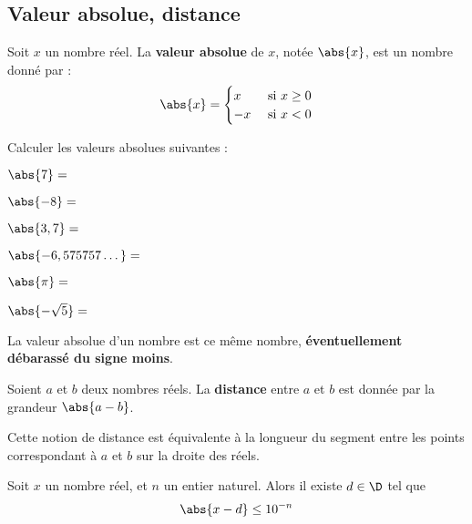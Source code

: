 \documentclass{article}
\begin{document}
\subsection{Valeur absolue, distance}
\begin{tcolorbox}
\begin{definition}
Soit $x$ un nombre réel. La \textbf{valeur absolue} de $x$, notée $\abs{x}$, est un nombre donné par :
\begin{equation*}
\abs{x} = \begin{cases}
x&\text{ si }x \geq 0\\
-x&\text{ si }x < 0\\
\end{cases}
\end{equation*}
\end{definition}
\end{tcolorbox}
\begin{example}
Calculer les valeurs absolues suivantes :
\begin{enumquestions}
\item $\abs{7} = $ \answersline
\item $\abs{-8} = $ \answersline
\item $\abs{3,7} = $ \answersline
\item $\abs{- 6,575757\dots} = $ \answersline
\item $\abs{\pi} = $ \answersline
\item $\abs{-\sqrt{5}} = $ \answersline
\end{enumquestions}
\end{example}
\begin{remark}
La valeur absolue d'un nombre est ce même nombre, \textbf{éventuellement débarassé du signe moins}.
\end{remark}
\begin{tcolorbox}
\begin{definition}
Soient $a$ et $b$ deux nombres réels. La \textbf{distance} entre $a$ et $b$ est donnée par la grandeur $\abs{a - b}$.
\end{definition}
\end{tcolorbox}
\begin{remark}
Cette notion de distance est équivalente à la longueur du segment entre les points correspondant à $a$ et $b$ sur la droite des réels.
\end{remark}
\begin{proposition}
Soit $x$ un nombre réel, et $n$ un entier naturel. Alors il existe $d \in \D$ tel que
\begin{equation*}
\abs{x - d} \leq 10^{-n}
\end{equation*}
\end{proposition}
\end{document}
